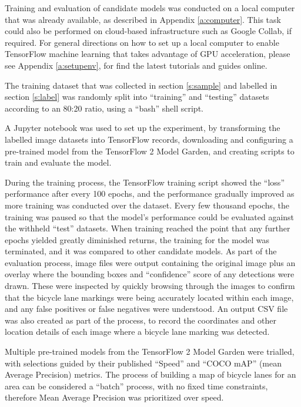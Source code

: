 \documentclass[11pt,twoside]{report}
\begin{document}
Training and evaluation of candidate models was conducted on a local computer that was already available, as described in Appendix \ref{a:computer}.  This task could also be performed on cloud-based infrastructure such as Google Collab, if required.  For general directions on how to set up a local computer to enable TensorFlow machine learning that takes advantage of GPU acceleration, please see Appendix \ref{a:setupenv}, for find the latest tutorials and guides online.

The training dataset that was collected in section \ref{s:sample} and labelled in section \ref{s:label} was randomly split into ``training'' and ``testing'' datasets according to an 80:20 ratio, using a ``bash'' shell script.

A Jupyter notebook was used to set up the experiment, by transforming the labelled image datasets into TensorFlow records, downloading and configuring a pre-trained model from the TensorFlow 2 Model Garden, and creating scripts to train and evaluate the model.

During the training process, the TensorFlow training script showed the ``loss'' performance after every 100 epochs, and the performance gradually improved as more training was conducted over the dataset.  Every few thousand epochs, the training was paused so that the model's performance could be evaluated against the withheld ``test'' datasets.  When training reached the point that any further epochs yielded greatly diminished returns, the training for the model was terminated, and it was compared to other candidate models.  As part of the evaluation process, image files were output containing the original image plus an overlay where the bounding boxes and ``confidence'' score of any detections were drawn.  These were inspected by quickly browsing through the images to confirm that the bicycle lane markings were being accurately located within each image, and any false positives or false negatives were understood.  An output CSV file was also created as part of the process, to record the coordinates and other location details of each image where a bicycle lane marking was detected.

Multiple pre-trained models from the TensorFlow 2 Model Garden were trialled, with selections guided by their published ``Speed'' and ``COCO mAP'' (mean Average Precision) metrics.  The process of building a map of bicycle lanes for an area can be considered a ``batch'' process, with no fixed time constraints, therefore Mean Average Precision was prioritized over speed.
\end{document}
